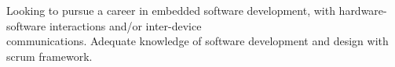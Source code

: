%
%

\par{
Looking to pursue a career in embedded software development, with hardware-software interactions and/or inter-device\\ communications. Adequate knowledge of software development and design with scrum framework.
}